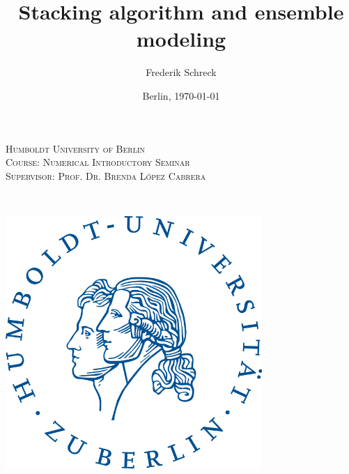 \documentclass[12pt]{article}
\title{Stacking algorithm and ensemble modeling}
\author{Frederik Schreck}
\date{Berlin, \today}
\begin{document}

\begin{titlepage} %
	\newcommand{\HRule}{\rule{\linewidth}{0.5mm}} %
	


	\begin{minipage}{0.77\textwidth}
		\begin{flushleft}
			\large
			\textsc{Humboldt University of Berlin\\
			Course: Numerical Introductory Seminar\\
			Supervisor: Prof. Dr. Brenda López Cabrera\\}
		\end{flushleft}
	\end{minipage}
		~
	\begin{minipage}{0.2\textwidth}
		\begin{flushleft}
		\includegraphics[width=0.73\textwidth]{graphs/HU_logo.png}\\
		\end{flushleft}
	\end{minipage}
	
	\vspace{2cm}


\end{titlepage}
\end{document}
